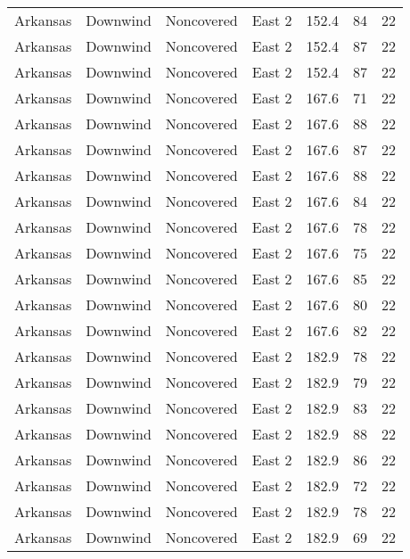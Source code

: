 \documentclass{article}
\begin{document}
\begin{longtable}[H]{ccccccc}
Arkansas & Downwind  & Noncovered & East 2        & 152.4        & 84          & 22  \\
Arkansas & Downwind  & Noncovered & East 2        & 152.4        & 87          & 22  \\
Arkansas & Downwind  & Noncovered & East 2        & 152.4        & 87          & 22  \\
Arkansas & Downwind  & Noncovered & East 2        & 167.6        & 71          & 22  \\
Arkansas & Downwind  & Noncovered & East 2        & 167.6        & 88          & 22  \\
Arkansas & Downwind  & Noncovered & East 2        & 167.6        & 87          & 22  \\
Arkansas & Downwind  & Noncovered & East 2        & 167.6        & 88          & 22  \\
Arkansas & Downwind  & Noncovered & East 2        & 167.6        & 84          & 22  \\
Arkansas & Downwind  & Noncovered & East 2        & 167.6        & 78          & 22  \\
Arkansas & Downwind  & Noncovered & East 2        & 167.6        & 75          & 22  \\
Arkansas & Downwind  & Noncovered & East 2        & 167.6        & 85          & 22  \\
Arkansas & Downwind  & Noncovered & East 2        & 167.6        & 80          & 22  \\
Arkansas & Downwind  & Noncovered & East 2        & 167.6        & 82          & 22  \\
Arkansas & Downwind  & Noncovered & East 2        & 182.9        & 78          & 22  \\
Arkansas & Downwind  & Noncovered & East 2        & 182.9        & 79          & 22  \\
Arkansas & Downwind  & Noncovered & East 2        & 182.9        & 83          & 22  \\
Arkansas & Downwind  & Noncovered & East 2        & 182.9        & 88          & 22  \\
Arkansas & Downwind  & Noncovered & East 2        & 182.9        & 86          & 22  \\
Arkansas & Downwind  & Noncovered & East 2        & 182.9        & 72          & 22  \\
Arkansas & Downwind  & Noncovered & East 2        & 182.9        & 78          & 22  \\
Arkansas & Downwind  & Noncovered & East 2        & 182.9        & 69          & 22  \\

\end{longtable}
\end{document}
